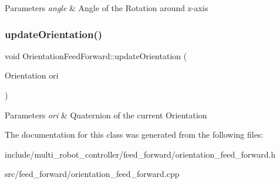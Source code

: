 \begin{DoxyParams}{Parameters}
{\em angle} & Angle of the Rotation around z-\/axis \\
\hline
\end{DoxyParams}
\mbox{\label{classOrientationFeedForward_aed8f826976135c0cd55408a652993828}} 
\subsubsection{\texorpdfstring{update\+Orientation()}{updateOrientation()}\hspace{0.1cm}{\footnotesize\ttfamily [2/2]}}
{\footnotesize\ttfamily void Orientation\+Feed\+Forward\+::update\+Orientation (\begin{DoxyParamCaption}\item[{Orientation}]{ori }\end{DoxyParamCaption})}


\begin{DoxyParams}{Parameters}
{\em ori} & Quaternion of the current Orientation \\
\hline
\end{DoxyParams}


The documentation for this class was generated from the following files\+:\begin{DoxyCompactItemize}
\item 
include/multi\+\_\+robot\+\_\+controller/feed\+\_\+forward/orientation\+\_\+feed\+\_\+forward.\+h\item 
src/feed\+\_\+forward/orientation\+\_\+feed\+\_\+forward.\+cpp\end{DoxyCompactItemize}
